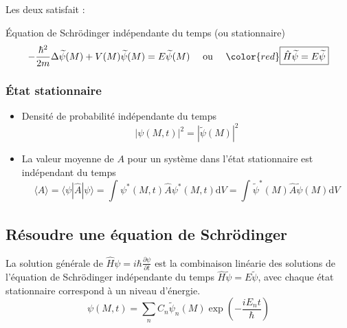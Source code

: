 Les deux satisfait : 

\begin{Theorem}{Équation de Schrödinger indépendante du temps (ou stationnaire)}{}
\begin{equation}
  - \frac{\hbar ^{2}}{2m} \Delta \widetilde{\psi}(M) + V(M) \widetilde{\psi}(M) = E  \widetilde{\psi}(M) \quad\text{ ou } \quad \color{red} \boxed{\hat{H} \widetilde{\psi} = E \widetilde{\psi}}
\end{equation}
\end{Theorem}


\subsubsection{État stationnaire} %
\label{sub:État stationnaire}

\begin{itemize}

    \item Densité de probabilité indépendante du temps 
      \begin{equation}
        | \psi(M,t) | ^{2} = | \widetilde \psi(M) | ^{2}
      \end{equation}

    \item La valeur moyenne de $A$ pour un système dans l'état stationnaire est indépendant du temps 
      \begin{equation}
        \langle A \rangle =  \langle \psi | \hat{A} | \psi  \rangle = \int_{}^{} \psi ^{*}(M,t) \hat{A} \psi ^{*}(M,t) \mathrm{d}V = \int_{}^{} \widetilde{\psi} ^{*}(M) \hat{A} \widetilde{\psi}(M) \mathrm{d}V
      \end{equation}

\end{itemize}


\subsection{Résoudre une équation de Schrödinger} %
\label{sub:Résoudre une équation de Schrödinger}

La solution générale de $\hat{H} \psi = i \hbar \frac{\partial  \psi}{\partial t}$ est la combinaison linéarie des solutions de l'équation de Schrödinger indépendante du temps $\hat{H} \widetilde \psi = E \widetilde \psi$, avec chaque état stationnaire correspond à un niveau d'énergie.
\begin{equation}
  \boxed{\psi(M,t) = \sum_{n}^{}C_n \widetilde{\psi}_n(M) \exp \left( - \frac{iE_nt}{\hbar}  \right)}
\end{equation}

